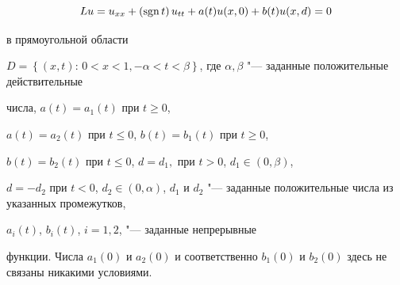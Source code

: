 \begin{equation}

\label{arkhip:eq1} Lu =   u_{xx} + \left( \mathop{\rm sgn } t \right) u_{tt} +

a(t) u(x, 0) + b(t) u (x, d)= 0

\end{equation}

в прямоугольной области

$D=\left\{ { \left( {x,t} \right):\, 0 < x < 1, -\alpha < t <\beta }

\right\}$, где $\alpha,\beta$ "--- заданные положительные действительные

числа, $a(t)=a_{1}(t)$ при $t\geq{0}$,

$a(t)=a_{2}(t)$ при $t\leq{0}$, $b(t)=b_{1}(t)$ при $t\geq{0}$,

$b(t)=b_{2}(t)$ при $t\leq{0}$, $d=d_{1},$ при $t>{0}$, $d_{1} \in \left(0, \beta\right)$,

$d= - d_{2}$ при $t<{0}$, $d_{2} \in \left(0,\alpha\right)$, $d_{1}$ и $d_{2}$ "--- заданные положительные числа из указанных промежутков,

$a_{i}(t)$, $b_{i}(t)$, $i = 1, 2$, "--- заданные непрерывные

функции. Числа $a_{1}\left(0\right)$ и $a_{2}\left(0\right)$ и соответственно $b_{1}\left(0\right)$ и $b_{2}\left(0\right)$ здесь не связаны никакими условиями.



\smallskip

